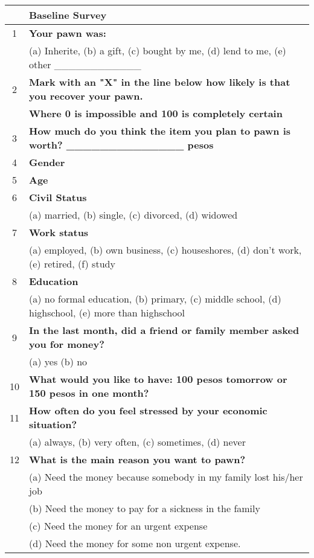 \begin{tabular}{cl}
\toprule
      & \textbf{Baseline Survey} \\
\midrule
\midrule
1     & \textbf{Your pawn was:} \\
      & (a) Inherite, (b) a gift, (c) bought by me, (d) lend to me, (e) other \_\_\_\_\_\_\_\_\_\_\_\_ \\
2     & \textbf{Mark with an "X" in the line below how likely is that you recover your pawn. } \\
      & \textbf{Where 0 is impossible and 100 is completely certain} \\
3     & \textbf{How much do you think the item you plan to pawn is worth?       \_\_\_\_\_\_\_\_\_\_\_\_\_\_ pesos} \\
4     & \textbf{Gender      } \\
5     & \textbf{Age} \\
6     & \textbf{Civil Status } \\
      & (a) married, (b) single, (c) divorced, (d) widowed \\
7     & \textbf{Work status} \\
      & (a) employed, (b) own business, (c) houseshores, (d) don't work, (e) retired, (f) study \\
8     & \textbf{Education} \\
      & (a) no formal education, (b) primary, (c) middle school, (d) highschool, (e) more than highschool \\
9     & \textbf{In the last month, did a friend or family member asked you for money?} \\
      & (a) yes  (b) no \\
10    & \textbf{What would you like to have: 100 pesos tomorrow or 150 pesos in one month?} \\
11    & \textbf{How often do you feel stressed by your economic situation?} \\
      & (a) always, (b) very often, (c) sometimes, (d) never \\
12    & \textbf{What is the main reason you want to pawn?} \\
      & (a) Need the money because somebody in my family lost his/her job \\
      & (b) Need the money to pay for a sickness in the family \\
      & (c) Need the money for an urgent expense \\
      & (d) Need the money for some non urgent expense. \\

\end{tabular}
